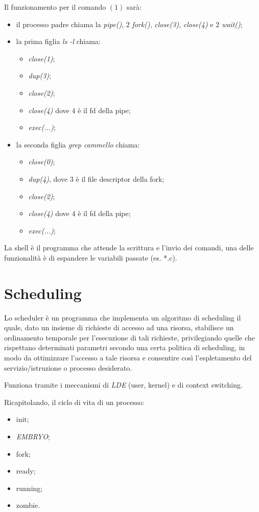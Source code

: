 Il funzionamento per il  comando $(1)$ sarà:
\begin{itemize}
  \item il processo padre chiama la \textit{pipe()}, $2$ \textit{fork()},
    \textit{close(3)}, \textit{close(4)} e $2$ \textit{wait()};
  \item la prima figlia \textit{ls -l} chiama:
    \begin{itemize}
      \item \textit{close(1)};
      \item \textit{dup(3)};
      \item \textit{close(2)};
      \item \textit{close(4)} dove $4$ è il fd della pipe;
      \item \textit{exec(...)};
    \end{itemize}
  \item la seconda figlia \textit{grep cammello} chiama:
    \begin{itemize}
      \item \textit{close(0)};
      \item \textit{dup(4)}, dove $3$ è il file descriptor della fork;
      \item \textit{close(2)};
      \item \textit{close(4)} dove $4$ è il fd della pipe;
      \item \textit{exec(...)};
    \end{itemize}
\end{itemize}

La shell è il programma che attende la scrittura e l'invio dei comandi, una
delle funzionalità è di espandere le variabili passate (es. *.c).

\section{Scheduling}
Lo scheduler è un programma che implementa un algoritmo di scheduling il quale,
dato un insieme di richieste di accesso ad una risorsa, stabilisce un
ordinamento temporale per l'esecuzione di tali richieste, privilegiando quelle
che rispettano determinati parametri secondo una certa politica di scheduling,
in modo da ottimizzare l'accesso a tale risorsa e consentire così
l'espletamento del servizio/istruzione o processo desiderato.

Funziona tramite i meccanismi di \emph{LDE} (user, kernel) e di context
switching.

Ricapitolando, il ciclo di vita di un processo:
\begin{itemize}
  \item init;
  \item \emph{EMBRYO};
  \item fork;
  \item ready;
  \item running;
  \item zombie.
\end{itemize}

